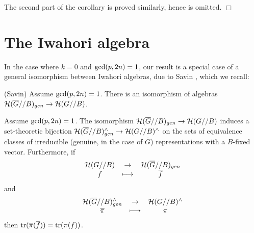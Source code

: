 The second part of the corollary is proved similarly,
hence is omitted.
$\Box$

\section{The Iwahori algebra}
\label{section:savin}

In the case where $k=0$ and ${\rm gcd}(p,2n)=1$, 
our result is a special
case of a general isomorphism between Iwahori algebras,
due to Savin \cite{S}, which we recall:

\begin{theorem} (Savin) Assume ${\rm gcd}(p,2n)=1$.
There is an isomorphism
of algebras
${\cal H}(\overline{G}//B)_{gen}\rightarrow {\cal H}(G//B)$.
\end{theorem}

\begin{corollary}
 Assume ${\rm gcd}(p,2n)=1$. The isomorphism
${\cal H}(\overline{G}//B)_{gen}\rightarrow {\cal H}(G//B)$
induces a set-theoretic 
bijection ${\cal H}(\overline{G}//B)_{gen}^\wedge
\rightarrow {\cal H}(G//B)^\wedge$ on the sets of equivalence
classes of irreducible (genuine, in the case of $\overline{G}$)
representations with a $B$-fixed vector.
Furthermore, if
\[
\begin{array}{ccc}
{\cal H}(G//B)&\rightarrow &{\cal H}(\overline{G}//B)_{gen}\\
f & \longmapsto &\overline{f}
\end{array}
\]
and 
\[
\begin{array}{ccc}
{\cal H}(\overline{G}//B)_{gen}^\wedge &\rightarrow &{\cal H}(G//B)^\wedge\\
\overline{\pi}&\longmapsto &\pi
\end{array}
\]
then ${\rm tr}(\overline{\pi}(\overline{f}))={\rm tr}(\pi(f))$.
\end{corollary}


